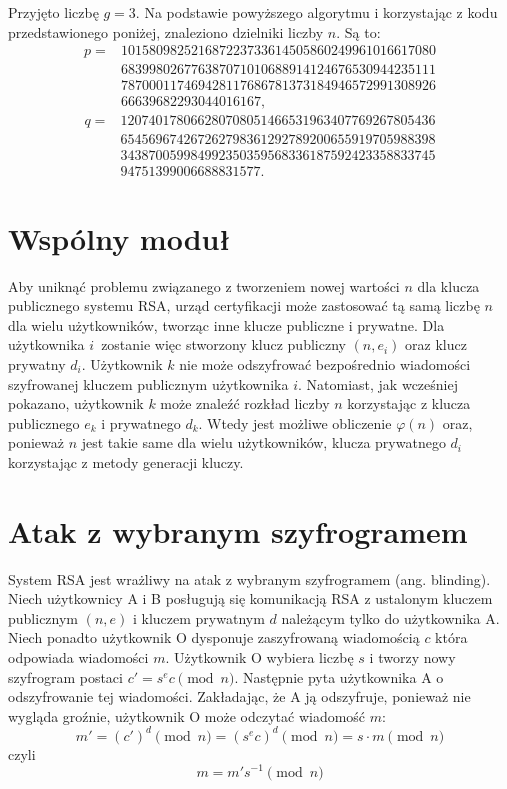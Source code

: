 \documentclass[12pt,twoside,a4]{mwbk}
\theoremstyle{definition}
\begin{document}
Przyjęto liczbę $g = 3$. Na podstawie powyższego algorytmu i korzystając z kodu przedstawionego poniżej, znaleziono dzielniki liczby $n$. Są to:
\begin{align*} p = &101580982521687223733614505860249961016617080 \\
&683998026776387071010688914124676530944235111 \\
&787000117469428117686781373184946572991308926 \\
&66639682293044016167,
\end{align*}
\begin{align*} q = &120740178066280708051466531963407769267805436 \\
&654569674267262798361292789200655919705988398 \\
&343870059984992350359568336187592423358833745 \\
&94751399006688831577.
\end{align*}




\section{Wspólny moduł \cite{survey}}
Aby uniknąć problemu związanego z tworzeniem nowej wartości $n$ dla klucza publicznego systemu RSA, urząd certyfikacji może zastosować tą samą liczbę $n$ dla wielu użytkowników, tworząc inne klucze publiczne i prywatne. Dla użytkownika $i$~zostanie więc stworzony klucz publiczny $(n,e_i)$ oraz klucz prywatny $d_i$. Użytkownik $k$ nie może odszyfrować bezpośrednio wiadomości szyfrowanej kluczem publicznym użytkownika $i$. Natomiast, jak wcześniej pokazano, użytkownik $k$ może znaleźć rozkład liczby $n$ korzystając z klucza publicznego $e_k$ i prywatnego $d_k$. Wtedy jest możliwe obliczenie $\varphi(n)$ oraz, ponieważ $n$ jest takie same dla wielu użytkowników, klucza prywatnego $d_i$ korzystając z metody generacji kluczy.

\section{Atak z wybranym szyfrogramem \cite{survey}}
System RSA jest wrażliwy na atak z wybranym szyfrogramem (ang. blinding). Niech użytkownicy A i B posługują się komunikacją RSA z ustalonym kluczem publicznym $(n,e)$ i kluczem prywatnym $d$ należącym tylko do użytkownika A. Niech ponadto użytkownik O dysponuje zaszyfrowaną wiadomością $c$ która odpowiada wiadomości $m$. Użytkownik O wybiera liczbę $s$ i tworzy nowy szyfrogram postaci $c' = s^e c \pmod{n}$. Następnie pyta użytkownika A o odszyfrowanie tej wiadomości. Zakładając, że A ją odszyfruje, ponieważ nie wygląda groźnie, użytkownik O może odczytać wiadomość $m$:
\[ m' = (c')^d \pmod n = (s^e c)^d \pmod n = s \cdot m \pmod n \] czyli \[ m = m' s^{-1} \pmod n \]
\end{document}
